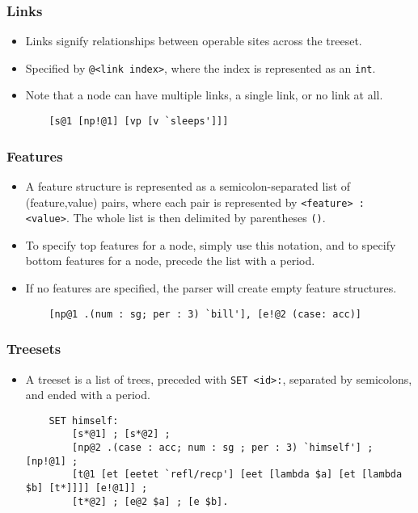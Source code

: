 \documentclass[10.5pt]{article}
\newcommand{\code}[1]{\texttt{#1}}
\begin{document}
\subsubsection{Links}
  \begin{itemize}
	\item Links signify relationships between operable sites across the treeset.
	\item Specified by \code{@<link index>}, where the index is represented as an \code{int}.
	\item Note that a node can have multiple links, a single link, or no link at all.

	\begin{mdframed}[backgroundcolor=blue!5]
	\begin{verbatim}
	[s@1 [np!@1] [vp [v `sleeps']]]
	\end{verbatim}
	\end{mdframed}
  \end{itemize}

\subsubsection{Features}
  \begin{itemize}
	\item A feature structure is represented as a semicolon-separated list of
	  (feature,value) pairs, where each pair is represented by \code{<feature> : <value>}.
	  The whole list is then delimited by parentheses \code{()}.
	\item To specify top features for a node, simply use this notation, and to specify bottom features for a node, precede the list with a period.
	\item If no features are specified, the parser will create empty feature structures.

	\begin{mdframed}[backgroundcolor=blue!5]
	\begin{verbatim}
	[np@1 .(num : sg; per : 3) `bill'], [e!@2 (case: acc)]
	\end{verbatim}
	\end{mdframed}
  \end{itemize}

\subsubsection{Treesets}
  \begin{itemize}
	\item A treeset is a list of trees, preceded with \code{SET <id>:}, separated by semicolons, and ended with a period.

	\begin{mdframed}[backgroundcolor=blue!5]
	\begin{verbatim}
	SET himself:
	    [s*@1] ; [s*@2] ;
	    [np@2 .(case : acc; num : sg ; per : 3) `himself'] ; [np!@1] ;
	    [t@1 [et [eetet `refl/recp'] [eet [lambda $a] [et [lambda $b] [t*]]]] [e!@1]] ;
	    [t*@2] ; [e@2 $a] ; [e $b].
	\end{verbatim}
	\end{mdframed}
  \end{itemize}
\end{document}
